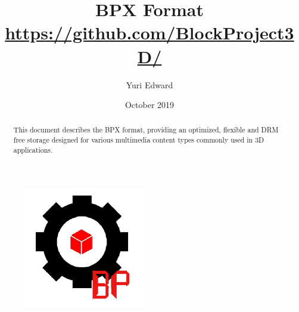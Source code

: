 \documentclass{article}
\title{
    \huge \textbf{BPX Format} \\
    \large \url{https://github.com/BlockProject3D/}
}
\author{Yuri Edward}
\date{October 2019}
\begin{document}
\maketitle

\begin{figure}[h!]
    \centering
    \includegraphics[scale=1.1]{logo}
    \label{fig:logo}
\end{figure}

\newpage

\begin{abstract}
    This document describes the BPX format, providing an optimized, flexible and DRM \cite{DRM} free storage designed for various multimedia content types commonly used in 3D applications.
\end{abstract}
\doclicenseThis














\end{document}
